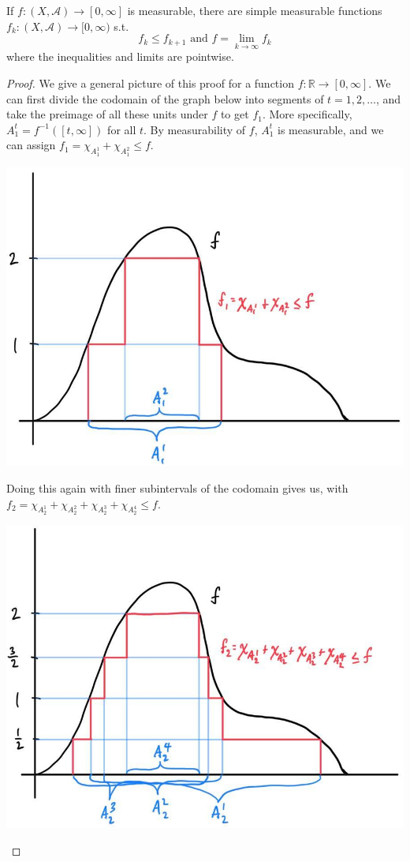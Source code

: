   \begin{theorem}
    If $f: (X, \mathcal{A}) \longrightarrow [0, \infty]$ is measurable, there are simple measurable functions $f_k : (X, \mathcal{A}) \longrightarrow [0, \infty)$ s.t. 
    \begin{equation}
      f_k \leq f_{k+1} \text{ and } f = \lim_{k \rightarrow \infty} f_k
    \end{equation}
    where the inequalities and limits are pointwise. 
  \end{theorem}
  \begin{proof}
    We give a general picture of this proof for a function $f: \mathbb{R} \longrightarrow [0, \infty]$. We can first divide the codomain of the graph below into segments of $t = 1, 2, \ldots$, and take the preimage of all these units under $f$ to get $f_1$. More specifically, $A_1^t = f^{-1} ([t, \infty])$ for all $t$. By measurability of $f$, $A_1^t$ is measurable, and we can assign $f_1 = \chi_{A^1_1} + \chi_{A_1^2} \leq f$. 
    \begin{center}
        \includegraphics[scale=0.23]{img/Lebesgue_1.jpg}
    \end{center}
    Doing this again with finer subintervals of the codomain gives us, with $f_2 = \chi_{A_2^1} + \chi_{A_2^2} + \chi_{A_2^3} + \chi_{A_2^4} \leq f$. 
    \begin{center}
        \includegraphics[scale=0.23]{img/Lebesgue_2.jpg}

\end{center}
\end{proof}
